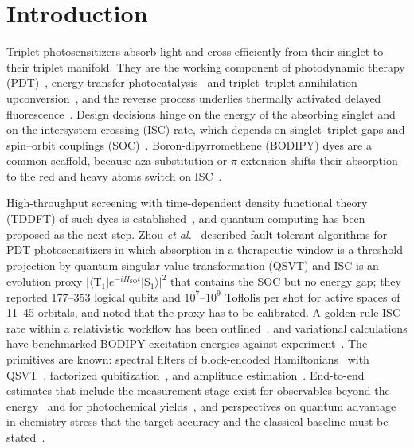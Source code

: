 \documentclass[journal=jctcce,manuscript=article]{achemso}
\newcommand{\Hso}{\hat H_\mathrm{SO}}
\begin{document}
\section{Introduction}

Triplet photosensitizers absorb light and cross efficiently from their singlet to their triplet
manifold. They are the working component of photodynamic therapy (PDT)~\cite{Agostinis2011},
energy-transfer photocatalysis~\cite{StriethKalthoff2018} and triplet--triplet annihilation
upconversion~\cite{SinghRachford2010}, and the reverse process underlies thermally activated delayed
fluorescence~\cite{Uoyama2012}. Design decisions hinge on the energy of the absorbing singlet and on the
intersystem-crossing (ISC) rate, which depends on singlet--triplet gaps and spin--orbit couplings
(SOC)~\cite{Marian2012}. Boron-dipyrromethene (BODIPY) dyes are a common scaffold, because
aza substitution or $\pi$-extension shifts their absorption to the red and heavy atoms switch on
ISC~\cite{Loudet2007,Kamkaew2013}.

High-throughput screening with time-dependent density functional theory (TDDFT) of such dyes is established~\cite{GomezBombarelli2016}, and quantum
computing has been proposed as the next step. Zhou \emph{et al.}~\cite{Zhou2026PRA} described
fault-tolerant algorithms for PDT photosensitizers in which absorption in a therapeutic window is a threshold projection by quantum singular value
transformation (QSVT) and ISC is an evolution proxy $\lvert\langle\mathrm{T}_1\rvert
e^{-i\Hso t}\lvert\mathrm{S}_1\rangle\rvert^2$ that contains the SOC but no energy gap; they reported
177--353 logical qubits and $10^{7}$--$10^{9}$ Toffolis per shot for active spaces of 11--45 orbitals,
and noted that the proxy has to be calibrated. A golden-rule ISC rate within a relativistic workflow has
been outlined~\cite{Zak2026}, and variational calculations have benchmarked BODIPY excitation energies
against experiment~\cite{Nykanen2024}. The primitives are known: spectral filters of block-encoded
Hamiltonians~\cite{Roggero2020,Rall2020} with QSVT~\cite{Gilyen2019}, factorized
qubitization~\cite{vonBurg2021,Lee2021}, and amplitude
estimation~\cite{Brassard2002,Suzuki2020}. End-to-end estimates that
include the measurement stage exist for observables beyond the energy~\cite{Steudtner2023} and for
photochemical yields~\cite{Eklund2026}, and perspectives on quantum advantage in chemistry stress that the
target accuracy and the classical baseline must be stated~\cite{Babbush2021}.
\end{document}
